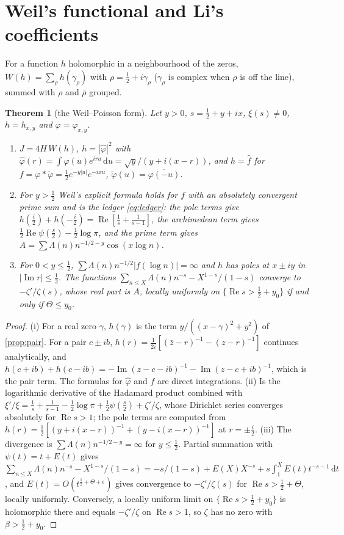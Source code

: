 \documentclass[11pt]{article}
\newtheorem{theorem}{Theorem}[section]
\theoremstyle{definition}\newtheorem{definition}[theorem]{Definition}
\theoremstyle{remark}\newtheorem{remark}[theorem]{Remark}
\newcommand{\dd}{\,\mathrm d}\newcommand{\e}{\mathrm e}
\renewcommand{\Re}{\operatorname{Re}}\renewcommand{\Im}{\operatorname{Im}}
\begin{document}
\section{Weil's functional and Li's coefficients}\label{sec:weil}

For a function $h$ holomorphic in a neighbourhood of the zeros, $W(h)=\sum_\rho h(\gamma_\rho)$ with $\rho=\frac12+i\gamma_\rho$ ($\gamma_\rho$ is complex when $\rho$ is off the line), summed with $\rho$ and $\bar\rho$ grouped.

\begin{theorem}[the Weil--Poisson form]\label{thm:weil}
Let $y>0$, $s=\frac12+y+ix$, $\xi(s)\ne0$, $h=h_{x,y}$ and $\varphi=\varphi_{x,y}$.
\begin{enumerate}[label=(\roman*)]
\item $J=4H\,W(h)$, $h=|\widehat\varphi|^2$ with $\widehat\varphi(r)=\int\varphi(u)e^{iru}\dd u=\sqrt y/(y+i(x-r))$, and $h=\widehat f$ for $f=\varphi*\tilde\varphi=\frac12e^{-y|u|}e^{-ixu}$, $\tilde\varphi(u)=\overline{\varphi(-u)}$.
\item For $y>\frac12$ Weil's explicit formula holds for $f$ with an absolutely convergent prime sum and is the ledger \eqref{eq:ledger}: the pole terms give $h(\frac i2)+h(-\frac i2)=\Re[\frac1s+\frac1{s-1}]$, the archimedean term gives $\frac12\Re\psi(\frac s2)-\frac12\log\pi$, and the prime term gives $A=\sum\Lambda(n)n^{-1/2-y}\cos(x\log n)$.
\item For $0<y\le\frac12$, $\sum\Lambda(n)n^{-1/2}|f(\log n)|=\infty$ and $h$ has poles at $x\pm iy$ in $|\Im r|\le\frac12$. The functions $\sum_{n\le X}\Lambda(n)n^{-s}-X^{1-s}/(1-s)$ converge to $-\zeta'/\zeta(s)$, whose real part is $A$, locally uniformly on $\{\Re s>\frac12+y_0\}$ if and only if $\Theta\le y_0$.
\end{enumerate}
\end{theorem}
\begin{proof}
(i) For a real zero $\gamma$, $h(\gamma)$ is the term $y/((x-\gamma)^2+y^2)$ of \cref{prop:pair}. For a pair $c\pm ib$, $h(r)=\frac1{2i}[(\bar z-r)^{-1}-(z-r)^{-1}]$ continues analytically, and $h(c+ib)+h(c-ib)=-\Im(z-c-ib)^{-1}-\Im(z-c+ib)^{-1}$, which is the pair term. The formulas for $\widehat\varphi$ and $f$ are direct integrations. (ii) Is the logarithmic derivative of the Hadamard product combined with $\xi'/\xi=\frac1s+\frac1{s-1}-\frac12\log\pi+\frac12\psi(\frac s2)+\zeta'/\zeta$, whose Dirichlet series converges absolutely for $\Re s>1$; the pole terms are computed from $h(r)=\frac12[(y+i(x-r))^{-1}+(y-i(x-r))^{-1}]$ at $r=\pm\frac i2$. (iii) The divergence is $\sum\Lambda(n)n^{-1/2-y}=\infty$ for $y\le\frac12$. Partial summation with $\psi(t)=t+E(t)$ gives $\sum_{n\le X}\Lambda(n)n^{-s}-X^{1-s}/(1-s)=-s/(1-s)+E(X)X^{-s}+s\int_1^XE(t)t^{-s-1}\dd t$, and $E(t)=O(t^{\frac12+\Theta+\epsilon})$ gives convergence to $-\zeta'/\zeta(s)$ for $\Re s>\frac12+\Theta$, locally uniformly. Conversely, a locally uniform limit on $\{\Re s>\frac12+y_0\}$ is holomorphic there and equals $-\zeta'/\zeta$ on $\Re s>1$, so $\zeta$ has no zero with $\beta>\frac12+y_0$.
\end{proof}
\end{document}
